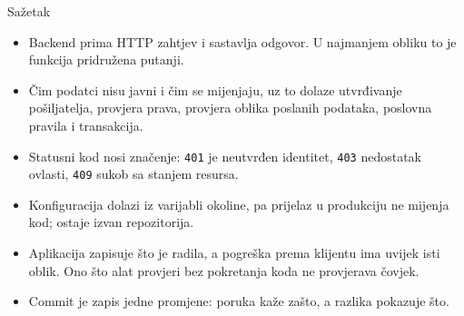 \begin{frame}{Sažetak}
\begin{itemize}
  \item Backend prima HTTP zahtjev i sastavlja odgovor. U najmanjem obliku to je funkcija pridružena putanji.
  \item Čim podatci nisu javni i čim se mijenjaju, uz to dolaze utvrđivanje pošiljatelja, provjera prava, provjera oblika poslanih podataka, poslovna pravila i transakcija.
  \item Statusni kod nosi značenje: \texttt{401} je neutvrđen identitet, \texttt{403} nedostatak ovlasti, \texttt{409} sukob sa stanjem resursa.
  \item Konfiguracija dolazi iz varijabli okoline, pa prijelaz u produkciju ne mijenja kod;  ostaje izvan repozitorija.
  \item Aplikacija zapisuje što je radila, a pogreška prema klijentu ima uvijek isti oblik. Ono što alat provjeri bez pokretanja koda ne provjerava čovjek.
  \item Commit je zapis jedne promjene: poruka kaže zašto, a razlika pokazuje što.
\end{itemize}
\end{frame}


